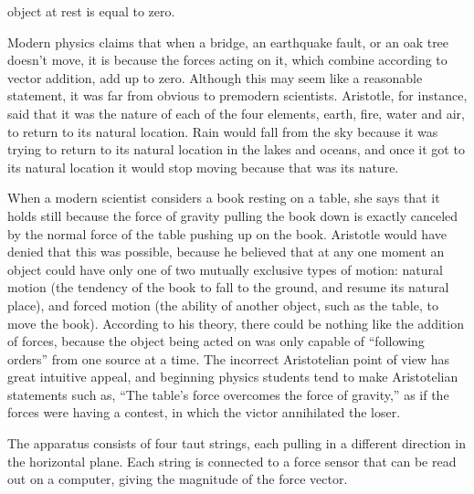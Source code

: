 
\label{lab:force_vector_digital}

\apparatus
{}

object at rest is equal to zero.

\introduction

Modern physics claims that when a bridge, an earthquake
fault, or an oak tree doesn't move, it is because the forces
acting on it, which combine according to vector addition,
add up to zero.  Although this may seem like a reasonable
statement, it was far from obvious to premodern scientists. 
Aristotle, for instance, said that it was the nature of each
of the four elements, earth, fire, water and air, to return
to its natural location.  Rain would fall from the sky
because it was trying to return to its natural location in
the lakes and oceans, and once it got to its natural
location it would stop moving because that was its nature.

When a modern scientist considers a book resting on a table,
she says that it holds still because the force of gravity
pulling the book down is exactly canceled by the normal
force of the table pushing up on the book.  Aristotle would
have denied that this was possible, because he believed that
at any one moment an object could have only one of two
mutually exclusive types of motion: natural motion (the
tendency of the book to fall to the ground, and resume its
natural place), and forced motion (the ability of another
object, such as the table, to move the book).  According to
his theory, there could be nothing like the addition of
forces, because the object being acted on was only capable
of ``following orders''  from one source at a time.  The
incorrect Aristotelian point of view has great intuitive
appeal, and beginning physics students tend to make
Aristotelian statements such as, ``The table's force
overcomes the force of gravity,'' as if the forces were
having a contest, in which the victor annihilated the loser.


\observations

The apparatus consists of 
four taut strings, each pulling in a different direction
in the horizontal plane. Each string is connected to a force sensor
that can be read out on a computer, giving the magnitude of the
force vector.



